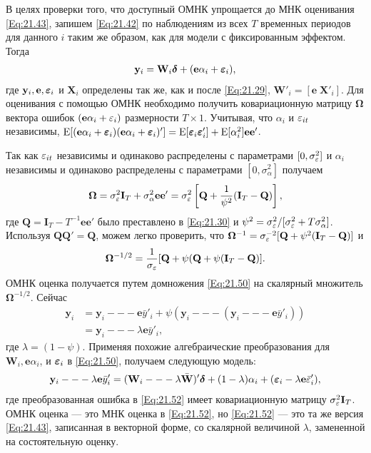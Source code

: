 В целях проверки того, что доступный ОМНК упрощается до МНК оценивания \ref{Eq:21.43}, запишем \ref{Eq:21.42} по наблюдениям из всех $T$ временных периодов для данного $i$ таким же образом, как для модели с фиксированным эффектом. Тогда
 \begin{align}
\mathbf y_i=\mathbf W_i \bm\delta + (\mathbf e \alpha_i + \bm{\varepsilon}_i),
\label{Eq:21.50}
\end{align}
где $\mathbf y_i, \mathbf e, \bm{\varepsilon}_i$ и $\mathbf X_i$ определены так же, как и после \ref{Eq:21.29}, $\mathbf W'_i = [\mathbf e \; \mathbf X'_i]$. Для оценивания с помощью ОМНК необходимо получить ковариационную матрицу $\bm\Omega$ вектора ошибок $(\mathbf e \alpha_i +\varepsilon_i)$ размерности $T \times 1$. Учитывая, что $\alpha_i$ и $\varepsilon_{it}$ независимы, $\mathrm E[( \mathbf e \alpha_i+\bm{\varepsilon}_{i})( \mathbf e \alpha_i+\bm{\varepsilon}_{i})']=\mathrm E[\bm{\varepsilon}_i \bm{\varepsilon}'_i]+\mathrm E[\alpha^2_i]\mathbf e \mathbf e'$.

Так как $\varepsilon_{it}$ независимы и одинаково распределены с параметрами $[0, \sigma^2_\varepsilon]$ и $\alpha_i$ независимы и одинаково распределены с параметрами $[0,\sigma^2_\alpha]$ получаем
 \begin{align}
\bm\Omega=\sigma^2_\varepsilon \mathbf I_T + \sigma^2_{\alpha} \mathbf e \mathbf e'=\sigma^2_\varepsilon
\left[\mathbf Q+ \frac{1}{\psi^2}(\mathbf I_T-\mathbf Q) \right],
\nonumber
\end{align}
где $\mathbf Q= \mathbf I_T-T^{-1} \mathbf e \mathbf e'$ было преставлено в \ref{Eq:21.30} и $\psi^2=\sigma^2_\varepsilon/[\sigma^2_\varepsilon+T \sigma^2_\alpha]$. Используя 
$\mathbf Q \mathbf Q'= \mathbf Q$, можем легко проверить, что $\bm\Omega^{-1}=\sigma^{-2}_\varepsilon[\mathbf Q + \psi^2(\mathbf I_T-\mathbf Q)]$ и 
 \begin{align}
\bm\Omega^{-1/2}=\frac{1}{\sigma_\varepsilon}[\mathbf Q +\psi (\mathbf Q +\psi (\mathbf I_T- \mathbf Q)].
\label{Eq:21.51}
\end{align}
ОМНК оценка получается путем домножения \ref{Eq:21.50} на скалярный множитель $\bm\Omega^{-1/2}$. Сейчас
 \begin{align}
[\bm\Omega+\psi (\mathbf I_T --- \mathbf Q)] \mathbf y_i
&=\mathbf y_i --- \mathbf e \bar{y}'_i + \psi(\mathbf y_i --- (\mathbf y_i --- \mathbf e \bar{y}'_i)) \nonumber \\
&=\mathbf y_i --- \lambda \mathbf e \bar{y}'_i,
\nonumber
\end{align}
где $\lambda=(1-\psi)$. Применяя похожие алгебраические преобразования для $\mathbf W_i, \mathbf e \alpha_i$, и $\bm{\varepsilon}_i$ в \ref{Eq:21.50}, получаем следующую модель:
 \begin{align}
\mathbf y_i --- \lambda \mathbf e \bar{y}'_i=(\mathbf W_i --- \lambda \bar{\mathbf W})'\bm\delta+(1-\lambda)\alpha_i+(\bm{\varepsilon}_i-\lambda \mathbf e \bar{\varepsilon}'_i),
\label{Eq:21.52}
\end{align}
где преобразованная ошибка в \ref{Eq:21.52} имеет ковариационную матрицу $\sigma^2_\varepsilon \mathbf I_T$. ОМНК оценка --- это МНК оценка в \ref{Eq:21.52}, но \ref{Eq:21.52} --- это та же версия \ref{Eq:21.43}, записанная в векторной форме, со скалярной величиной $\lambda$, замененной на состоятельную оценку.

